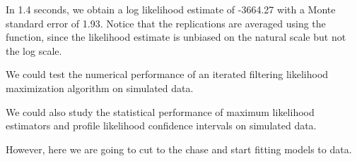 \documentclass{beamer}\usepackage[]{graphicx}\usepackage[]{color}
\begin{document}
\begin{frame}[fragile]

\bi

\item In  1.4 seconds, we obtain a log likelihood estimate of -3664.27 with a Monte standard error of 1.93. Notice that the replications are averaged using the  function, since the likelihood estimate is unbiased on the natural scale but not the log scale.

\item We could test the numerical performance of an iterated filtering likelihood maximization algorithm on simulated data. 

\item We could also study the statistical performance of maximum likelihood estimators and profile likelihood confidence intervals on simulated data. 

\item However, here we are going to cut to the chase and start fitting models to data. 

\ei

\end{frame}
\end{document}
